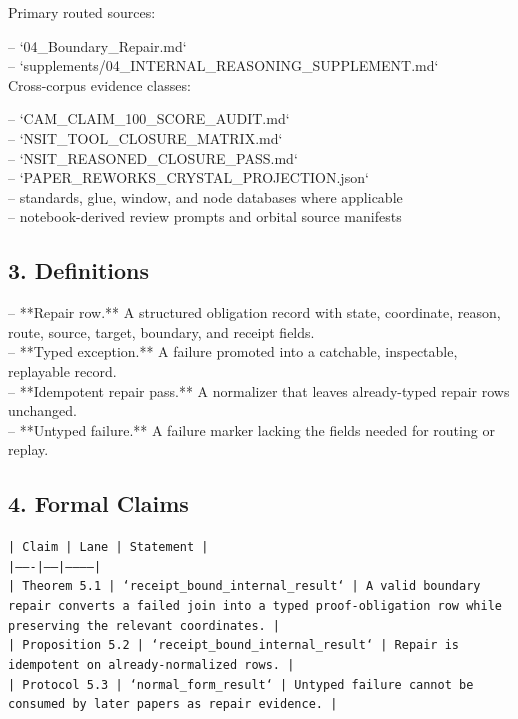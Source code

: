 \documentclass[11pt]{article}
\begin{document}
Primary routed sources:

\noindent{}-- `04\_Boundary\_Repair.md`\\
\noindent{}-- `supplements/04\_INTERNAL\_REASONING\_SUPPLEMENT.md`\\

Cross-corpus evidence classes:

\noindent{}-- `CAM\_CLAIM\_100\_SCORE\_AUDIT.md`\\
\noindent{}-- `NSIT\_TOOL\_CLOSURE\_MATRIX.md`\\
\noindent{}-- `NSIT\_REASONED\_CLOSURE\_PASS.md`\\
\noindent{}-- `PAPER\_REWORKS\_CRYSTAL\_PROJECTION.json`\\
\noindent{}-- standards, glue, window, and node databases where applicable\\
\noindent{}-- notebook-derived review prompts and orbital source manifests\\

\subsection*{3. Definitions}

\noindent{}-- **Repair row.** A structured obligation record with state, coordinate, reason, route, source, target, boundary, and receipt fields.\\
\noindent{}-- **Typed exception.** A failure promoted into a catchable, inspectable, replayable record.\\
\noindent{}-- **Idempotent repair pass.** A normalizer that leaves already-typed repair rows unchanged.\\
\noindent{}-- **Untyped failure.** A failure marker lacking the fields needed for routing or replay.\\

\subsection*{4. Formal Claims}

\noindent\texttt{| Claim | Lane | Statement |}\\
\noindent\texttt{|-------|------|-----------|}\\
\noindent\texttt{| Theorem 5.1 | `receipt\_bound\_internal\_result` | A valid boundary repair converts a failed join into a typed proof-obligation row while preserving the relevant coordinates. |}\\
\noindent\texttt{| Proposition 5.2 | `receipt\_bound\_internal\_result` | Repair is idempotent on already-normalized rows. |}\\
\noindent\texttt{| Protocol 5.3 | `normal\_form\_result` | Untyped failure cannot be consumed by later papers as repair evidence. |}\\
\end{document}
